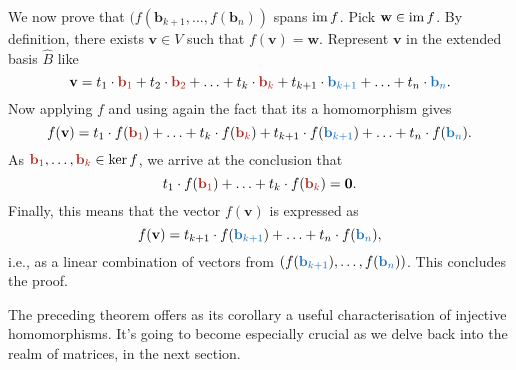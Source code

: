 \begin{propproof}
 We now prove that $(f(\mathbf{b}_{k+1},\ldots,f(\mathbf{b}_n))$ spans $\operatorname{im} f$.
 Pick $\mathbf{w} \in \operatorname{im} f$. By definition, there exists $\mathbf{v} \in V$
 such that $f(\mathbf{v}) = \mathbf{w}$. Represent $\mathbf{v}$ in the extended
 basis $\hat{B}$ like
 \[
  \mathbf{v} = t_1 \cdot \clr{\mathbf{b}_1} + t_2 \cdot \clr{\mathbf{b}_2} +
  \ldots + t_k \cdot \clr{\mathbf{b}_k} + t_{k+1} \cdot \clb{\mathbf{b}_{k+1}} +
  \ldots + t_n \cdot \clb{\mathbf{b}_n}.
 \]
 Now applying $f$ and using again the fact that its a homomorphism gives
 \[
  f(\mathbf{v}) = t_1 \cdot f(\clr{\mathbf{b}_1}) + \ldots + t_k \cdot
  f(\clr{\mathbf{b}_k}) + t_{k+1} \cdot f(\clb{\mathbf{b}_{k+1}}) + \ldots + t_n
  \cdot f(\clb{\mathbf{b}_n}).
 \]
 As $\clr{\mathbf{b}_1},\ldots,\clr{\mathbf{b}_k} \in \ker f$, we arrive at the
 conclusion that
 \[
  t_1 \cdot f(\clr{\mathbf{b}_1}) + \ldots + t_k \cdot f(\clr{\mathbf{b}_k}) =
  \mathbf{0}.
 \]
 Finally, this means that the vector $f(\mathbf{v})$ is expressed as
 \[
  f(\mathbf{v}) = t_{k+1} \cdot f(\clb{\mathbf{b}_{k+1}}) + \ldots + t_n \cdot
  f(\clb{\mathbf{b}_n}),
 \]
 i.e., as a linear combination of vectors from
 $(f(\clb{\mathbf{b}_{k+1}}),\ldots,f(\clb{\mathbf{b}_n}))$. This concludes the
 proof.
\end{propproof}

The preceding theorem offers as its corollary a useful characterisation of
injective homomorphisms. It's going to become especially crucial as we delve
back into the realm of matrices, in the next section.


